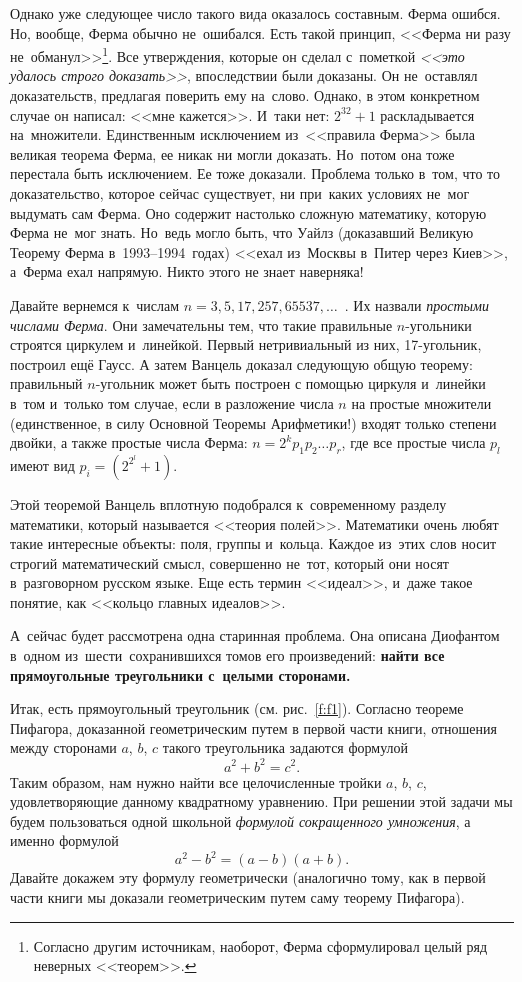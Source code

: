 Однако уже следующее число такого вида оказалось составным. Ферма ошибся. Но, вообще, Ферма обычно не~ошибался. Есть такой
принцип, <<Ферма ни разу не~обманул>>\footnote{Согласно другим источникам, наоборот, Ферма сформулировал целый ряд неверных <<теорем>>.}.
 Все утверждения, которые он сделал с~пометкой \textit{<<это удалось
строго доказать>>}, впоследствии были доказаны. Он не~оставлял доказательств, предлагая поверить ему
на~слово. Однако, в этом конкретном случае он написал: <<мне кажется>>. И~таки нет: $2^{32}+1$ раскладывается на~множители.
Единственным исключением из~<<правила Ферма>> была великая теорема Ферма, ее никак ни могли доказать. Но~потом
она тоже перестала быть исключением. Ее тоже доказали. Проблема только в~том,
что то доказательство, которое сейчас существует, ни при~каких условиях не~мог выдумать сам Ферма.
Оно содержит настолько сложную математику, которую Ферма не~мог знать. Но~ведь могло быть, что
Уайлз (доказавший Великую Теорему Ферма в~1993--1994~годах) <<ехал из~Москвы в~Питер через Киев>>, а~Ферма ехал
напрямую. Никто этого не знает наверняка!


Давайте вернемся к~числам $n=3, 5, 17, 257, 65537, \ldots$~. Их назвали {\em простыми числами Ферма}.
Они замечательны тем, что такие правильные $n$-угольники строятся циркулем и~линейкой.
Первый нетривиальный из них, 17-угольник, построил ещё Гаусс.  А затем Ванцель
доказал следующую общую теорему: правильный $n$-угольник может быть построен
с помощью циркуля и~линейки в~том и~только том случае, если в разложение числа $n$ на простые множители
(единственное, в силу Основной Теоремы\vadjust{\pagebreak} Арифметики!) входят только степени двойки, а также простые
числа Ферма: $n=2^k p_1 p_2 \ldots p_r$, где все простые числа $p_l$ имеют вид $p_i = (2^{2^l}+1)$.


Этой теоремой Ванцель вплотную подобрался к~современному разделу математики, который называется
<<теория полей>>.
 Математики очень любят такие интересные объекты: поля, группы и~кольца. Каждое
из~этих слов носит строгий математический смысл, совершенно не~тот, который они носят в~разговорном русском
языке.
 Еще есть термин <<идеал>>, и~даже такое понятие, как <<кольцо главных идеалов>>.

А~сейчас будет рассмотрена одна старинная проблема. Она описана Диофантом в~одном из~шести~сохранившихся томов его
произведений: \textbf{найти все прямоугольные треугольники с~целыми сторонами.}

Итак, есть прямоугольный треугольник (см. рис.~\ref{f:f1}). Согласно теореме Пифагора, доказанной
геометрическим путем в первой части книги, отношения между сторонами $a$, $b$, $c$
такого треугольника задаются формулой
$$
a^2+b^2=c^2.
$$
Таким образом, нам нужно найти все целочисленные тройки $a$, $b$, $c$, удовлетворяющие
данному квадратному уравнению. При решении этой задачи мы будем пользоваться одной
школьной {\em формулой сокращенного умножения}, а именно формулой
$$
a^2-b^2=(a-b)(a+b).
$$
Давайте докажем эту формулу геометрически (аналогично тому, как в первой части книги
мы доказали геометрическим путем саму теорему Пифагора).


